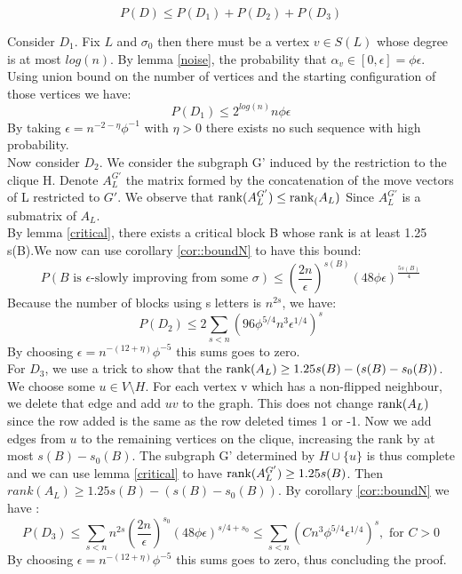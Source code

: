 \begin{equation*}
P(D) \leq P(D_1) + P(D_2) + P(D_3)
\end{equation*}

Consider $D_1$. Fix $L$ and $\sigma_0$ then there must be a vertex $v \in S(L)$ whose degree is at most $log(n)$. By lemma  \ref{noise}, the probability that $\alpha_v \in [0, \epsilon] = \phi \epsilon$. Using union bound on the number of vertices and the starting configuration of those vertices we have:
\begin{equation}
P(D_1)  \leq 2^{log(n)}n \phi \epsilon
\end{equation}
By taking $\epsilon = n^{-2 - \eta} \phi^{-1}$ with $\eta > 0$ there exists no such sequence with high probability. \\

Now consider $D_2$. We consider the subgraph G' induced by the restriction to the clique H. Denote $A_L^{G'}$ the matrix formed by the concatenation of the move vectors of L restricted to $G'$. We observe that $\text{rank}(A_L^{G'}) \leq \text{rank}_(A_L)$ Since $A_L^{G'}$ is a submatrix of $A_L$.\\ 
By lemma \ref{critical}, there exists a critical block B whose rank is at least 1.25 s(B).We now can use corollary \ref{cor::boundN} to have this bound:
\begin{equation*}
P(B \text{ is }\epsilon \text {-slowly improving from some }\sigma) \leq \left(\frac{2n}{\epsilon}\right)^{s(B)}(48\phi\epsilon)^{\frac{5s(B)}{4}}
\end{equation*}
Because the number of blocks using s letters is $n^{2s}$, we have:
\begin{equation*}
P(D_2) \leq 2 \sum_{s < n}(96\phi^{5/4}n^3\epsilon^{1/4})^s
\end{equation*}
By choosing $\epsilon = n^{-(12 + \eta)}\phi^{-5}$ this sums goes to zero.\\

For $D_3$, we use a trick to show that the $\text{rank}(A_L) \geq 1.25s(B) - (s(B) - s_0(B))$. We choose some $u \in V \setminus H$. For each vertex v which has a non-flipped neighbour, we delete that edge and add $uv$ to the graph. This does not change $\text{rank}(A_L)$ since the row added is the same as the row deleted times 1 or -1. Now we add edges from $u$ to the remaining vertices on the clique, increasing the rank by at most $s(B) - s_0(B)$. The subgraph G' determined by $H \cup \{u\}$ is thus complete and we can use  lemma \ref{critical} to have $\text{rank}(A_L^{G'}) \geq 1.25 s(B)$. Then $rank(A_L) \geq 1.25s(B) - (s(B) - s_0(B))$.
By corollary \ref{cor::boundN} we have :
\begin{equation*}
P(D_3) \leq  \sum_{s < n}n^{2s}\left(\dfrac{2n}{\epsilon}\right)^{s_0}(48\phi\epsilon)^{s/4 + s_0} \leq \sum_{s < n}(Cn^{3}\phi^{5/4}\epsilon^{1/4})^{s}, \text{ for }C>0
\end{equation*}
By choosing $\epsilon = n^{-(12 + \eta)}\phi^{-5}$ this sums goes to zero, thus concluding the proof.